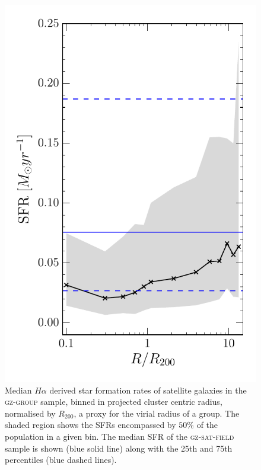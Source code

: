 \begin{figure}
\includegraphics[height=0.825\textheight]{environment/sfr_trend_with_log_radius_field_matched_blue_dashed_hlines_gomez_03_rv_not_r200.pdf}
\caption[Median SFR of the \textsc{gz-group} sample with projected cluster centric radius]{Median $H\alpha$ derived star formation rates of satellite galaxies in the \textsc{gz-group} sample, binned in projected cluster centric radius, normalised by $R_{200}$, a proxy for the virial radius of a group.  The shaded region shows the SFRs encompassed by $50\%$ of the population in a given bin. The median SFR of the \textsc{gz-sat-field} sample is shown (blue solid line) along with the 25th and 75th percentiles (blue dashed lines).}
\label{fig:sfrradius}
\end{figure}


